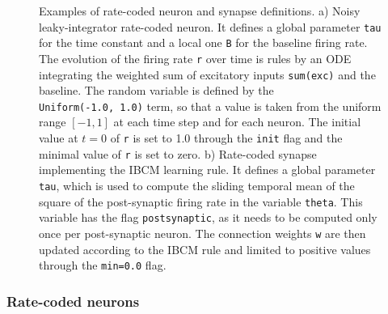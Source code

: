 \documentclass[
  11pt,
  a4paper,
]{scrbook}
\begin{document}
\begin{figure}


\caption{\label{fig-fini:ratecoded}Examples of rate-coded neuron and
synapse definitions. a) Noisy leaky-integrator rate-coded neuron. It
defines a global parameter \texttt{tau} for the time constant and a
local one \texttt{B} for the baseline firing rate. The evolution of the
firing rate \texttt{r} over time is rules by an ODE integrating the
weighted sum of excitatory inputs \texttt{sum(exc)} and the baseline.
The random variable is defined by the \texttt{Uniform(-1.0,\ 1.0)} term,
so that a value is taken from the uniform range \([-1, 1]\) at each time
step and for each neuron. The initial value at \(t=0\) of \texttt{r} is
set to 1.0 through the \texttt{init} flag and the minimal value of
\texttt{r} is set to zero. b) Rate-coded synapse implementing the IBCM
learning rule. It defines a global parameter \texttt{tau}, which is used
to compute the sliding temporal mean of the square of the post-synaptic
firing rate in the variable \texttt{theta}. This variable has the flag
\texttt{postsynaptic}, as it needs to be computed only once per
post-synaptic neuron. The connection weights \texttt{w} are then updated
according to the IBCM rule and limited to positive values through the
\texttt{min=0.0} flag.}

\end{figure}%

\subsubsection*{Rate-coded neurons}\label{rate-coded-neurons}
\end{document}
